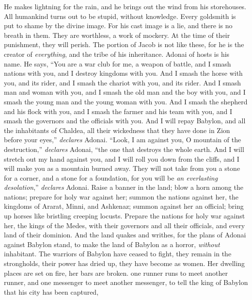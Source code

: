 \begin{biblechapter}
He makes lightning for the rain, 
and he brings out the wind from his storehouses.
\verse All humankind turns out to be stupid, 
without knowledge. 
Every goldsmith is put to shame 
by the divine image. 
For his cast image is a lie, 
and there is no breath in them.
\verse They are worthless, 
a work of mockery. 
At the time of their punishment, 
they will perish.
\verse The portion of Jacob is not like these, 
for he is the creator of \textit{everything}, 
and the tribe of his inheritance. 
Adonai of hosts is his name.
\verse He says, “You are a war club for me, 
a weapon of battle, 
and I smash nations with you, 
and I destroy kingdoms with you.
\verse And I smash the horse with you, 
and its rider, 
and I smash the chariot with you, 
and its rider.
\verse And I smash man and woman with you, 
and I smash the old man and the boy with you, 
and I smash the young man and the young woman with you.
\verse And I smash the shepherd and his flock with you, 
and I smash the farmer and his team with you, 
and I smash the governors and the officials with you.
\verse And I will repay Babylon, 
and all the inhabitants of Chaldea, 
all their wickedness that they have done in Zion 
before your eyes,” \textit{declares} Adonai.
\verse “Look, I am against you, 
O mountain of the destruction,” \textit{declares} Adonai, 
“the one that destroys the whole earth. 
And I will stretch out my hand against you, 
and I will roll you down from the cliffs, 
and I will make you as a mountain burned away.
\verse They will not take from you 
a stone for a corner, 
and a stone for a foundation, 
for you will be \textit{an everlasting desolation},” \textit{declares} Adonai.
\verse Raise a banner in the land; 
blow a horn among the nations; 
prepare for holy war against her; 
summon the nations against her, 
the kingdoms of Ararat, Minni, and Ashkenaz; 
summon against her an official; 
bring up horses like bristling creeping locusts.
\verse Prepare the nations for holy war against her, 
the kings of the Medes, 
with their governors and all their officials, 
and every land of their dominion.
\verse And the land quakes and writhes, 
for the plans of Adonai against Babylon stand, 
to make the land of Babylon as a horror, 
\textit{without} inhabitant.
\verse The warriors of Babylon have ceased to fight, 
they remain in the strongholds, 
their power has dried up, 
they have become as women. 
Her dwelling places are set on fire, 
her bars are broken.
\verse one runner runs to meet another runner, 
and one messenger to meet another messenger, 
to tell the king of Babylon that his city has been captured, 

\end{biblechapter}

